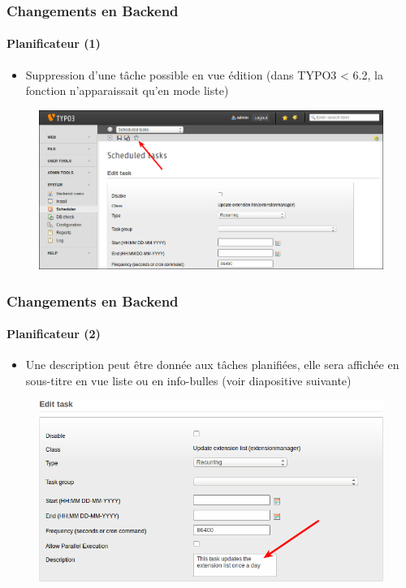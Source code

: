 
\begin{frame}[fragile]
	\frametitle{Changements en Backend}
	\framesubtitle{Planificateur (1)}

	\begin{itemize}
		\item Suppression d'une tâche possible en vue édition\newline
			(dans TYPO3 < 6.2, la fonction n'apparaissait qu'en mode liste)
	\end{itemize}

	\begin{figure}
		\includegraphics[width=0.95\linewidth]{Images/BackendChanges/DeleteSchedulerTaskInEditView.png}
	\end{figure}

\end{frame}


\begin{frame}[fragile]
	\frametitle{Changements en Backend}
	\framesubtitle{Planificateur (2)}

	\begin{itemize}
		\item Une description peut être donnée aux tâches planifiées, elle sera affichée en sous-titre en vue liste ou en info-bulles (voir diapositive suivante)
	\end{itemize}

	\begin{figure}
		\includegraphics[width=0.7\linewidth]{Images/BackendChanges/SchedulerTaskDescription.png}
	\end{figure}

\end{frame}

